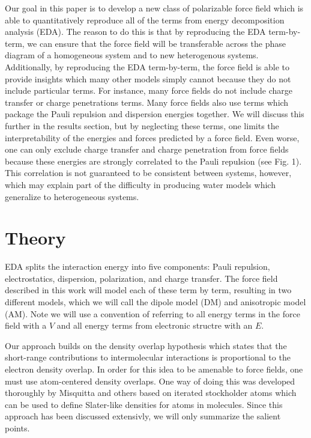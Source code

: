 \documentclass[journal=jacsat,manuscript=article]{achemso}
\begin{document}
Our goal in this paper is to develop a new class of polarizable
force field which is able to quantitatively reproduce all of the terms
from energy decomposition analysis (EDA). The reason to do this
is that by reproducing the EDA term-by-term, we can ensure that the force
field will be transferable across the phase diagram of a homogeneous
system and to new heterogenous systems.
Additionally, by reproducing the EDA term-by-term, the force field
is able to provide insights which many other models simply cannot because
they do not include particular terms. For instance, many force fields
do not include charge transfer or charge penetrations terms.
Many force fields also use terms which package the Pauli repulsion and dispersion 
energies together. We will discuss this further in the results section,
but by neglecting these terms, one limits the interpretability of the
energies and forces predicted by a force field. Even worse, one can only
exclude charge transfer and charge penetration from force fields because
these energies are strongly correlated to the Pauli repulsion (see Fig. 1).
This correlation is not guaranteed to be consistent between systems, however,
which may explain part of the difficulty in producing water models which
generalize to heterogeneous systems.

\section{Theory}
EDA splits the interaction energy into five components: Pauli repulsion,
electrostatics, dispersion, polarization, and charge transfer. The force
field described in this work will model each of these term by term, resulting
in two different models, which we will call the dipole model (DM) and
anisotropic model (AM). Note we will use a convention of referring to all energy
terms in the force field with a $V$ and all energy terms from electronic structre
with an $E$.

Our approach builds on the density overlap hypothesis\cite{kim1981dependence,wheatley1990overlap,gavezzotti2002calculation,van2016beyond}
which states that the short-range contributions to intermolecular
interactions is proportional to the electron density overlap. In order
for this idea to be amenable to force fields, one must use atom-centered
density overlaps. One way of doing this was developed thoroughly by
Misquitta and others\cite{misquitta2014distributed,misquitta2018isa} based
on iterated stockholder atoms which can be used to define Slater-like
densities for atoms in molecules. Since this approach has been discussed
extensivly, we will only summarize the salient points.
\end{document}

